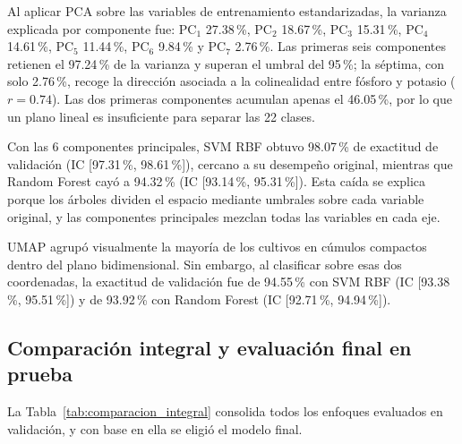 \documentclass[conference]{IEEEtran}
\begin{document}
Al aplicar PCA sobre las variables de entrenamiento estandarizadas, la varianza explicada por componente fue: $\text{PC}_1$ 27.38\,\%, $\text{PC}_2$ 18.67\,\%, $\text{PC}_3$ 15.31\,\%, $\text{PC}_4$ 14.61\,\%, $\text{PC}_5$ 11.44\,\%, $\text{PC}_6$ 9.84\,\% y $\text{PC}_7$ 2.76\,\%. Las primeras seis componentes retienen el 97.24\,\% de la varianza y superan el umbral del 95\,\%; la séptima, con solo 2.76\,\%, recoge la dirección asociada a la colinealidad entre fósforo y potasio ($r=0.74$). Las dos primeras componentes acumulan apenas el 46.05\,\%, por lo que un plano lineal es insuficiente para separar las 22 clases.

Con las 6 componentes principales, SVM RBF obtuvo 98.07\,\% de exactitud de validación (IC [97.31\,\%, 98.61\,\%]), cercano a su desempeño original, mientras que Random Forest cayó a 94.32\,\% (IC [93.14\,\%, 95.31\,\%]). Esta caída se explica porque los árboles dividen el espacio mediante umbrales sobre cada variable original, y las componentes principales mezclan todas las variables en cada eje.

UMAP agrupó visualmente la mayoría de los cultivos en cúmulos compactos dentro del plano bidimensional. Sin embargo, al clasificar sobre esas dos coordenadas, la exactitud de validación fue de 94.55\,\% con SVM RBF (IC [93.38\,\%, 95.51\,\%]) y de 93.92\,\% con Random Forest (IC [92.71\,\%, 94.94\,\%]).

\subsection{Comparación integral y evaluación final en prueba}

La Tabla~\ref{tab:comparacion_integral} consolida todos los enfoques evaluados en validación, y con base en ella se eligió el modelo final.
\end{document}
